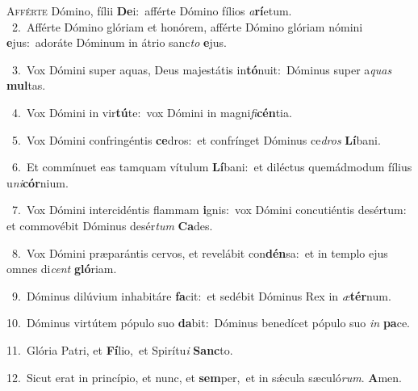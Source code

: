 \lettrine{\initial\textcolor{\initialcolor}{A}}{fférte} Dómino, fílii \textbf{De}\-i:~\star afférte Dómino fílios \textit{a}\-\textbf{rí}etum.\\
{\numbfont\textcolor{\numbcolor}{~2.}}~Afférte Dómino glóriam et honórem, afférte Dómino glóriam nómini \textbf{e}\-jus:~\star adoráte Dóminum in átrio sanc\textit{to} \textbf{e}\-jus.\par
{\numbfont\textcolor{\numbcolor}{~3.}}~Vox Dómini super aquas, Deus majestátis in\-\textbf{tó}\-nuit:~\star Dóminus super a\textit{quas} \textbf{mul}\-tas.\par
{\numbfont\textcolor{\numbcolor}{~4.}}~Vox Dómini in vir\-\textbf{tú}\-te:~\star vox Dómini in magni\-\textit{fi}\-\textbf{cén}tia.\par
{\numbfont\textcolor{\numbcolor}{~5.}}~Vox Dómini confringéntis \textbf{ce}\-dros:~\star et confrínget Dóminus ce\textit{dros} \textbf{Lí}\-bani.\par
{\numbfont\textcolor{\numbcolor}{~6.}}~Et commínuet eas tamquam vítulum \textbf{Lí}\-bani:~\star et diléctus quemádmodum fílius u\-\textit{ni}\-\textbf{cór}nium.\par
{\numbfont\textcolor{\numbcolor}{~7.}}~Vox Dómini intercidéntis flammam \textbf{i}\-gnis:~\star vox Dómini concutiéntis desértum: et commovébit Dóminus desér\textit{tum} \textbf{Ca}\-des.\par
{\numbfont\textcolor{\numbcolor}{~8.}}~Vox Dómini præparántis cervos, et revelábit con\-\textbf{dén}\-sa:~\star et in templo ejus omnes di\textit{cent} \textbf{gló}\-riam.\par
{\numbfont\textcolor{\numbcolor}{~9.}}~Dóminus dilúvium inhabitáre \textbf{fa}\-cit:~\star et sedébit Dóminus Rex in \textit{æ}\-\textbf{tér}num.\par
{\numbfont\textcolor{\numbcolor}{10.}}~Dóminus virtútem pópulo suo \textbf{da}\-bit:~\star Dóminus benedícet pópulo suo \textit{in} \textbf{pa}\-ce.\par
{\numbfont\textcolor{\numbcolor}{11.}}~Glória Patri, et \textbf{Fí}\-lio,~\star et Spirítu\textit{i} \textbf{Sanc}\-to.\par
{\numbfont\textcolor{\numbcolor}{12.}}~Sicut erat in princípio, et nunc, et \textbf{sem}\-per,~\star et in sǽcula sæculó\-\textit{rum}\-. \textbf{A}\-men.\par
